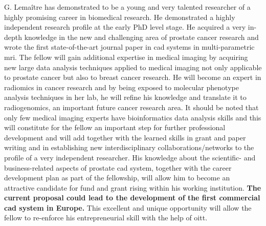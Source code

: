 G. Lema\^itre has demonstrated to be a young and very talented researcher of a highly promising career in biomedical research.
He demonstrated a highly independent research profile at the early PhD level stage. 
He acquired a very in-depth knowledge in the new and challenging area of prostate cancer research and wrote the first state-of-the-art journal paper in \ac{cad} systems in multi-parametric \ac{mri}.
The fellow will gain additional expertise in medical imaging by acquiring new large data analysis techniques applied to medical imaging not only applicable to prostate cancer but also to breast cancer research.
He will become an expert in radiomics in cancer research and by being exposed to molecular phenotype analysis techniques in her lab, he will refine his knowledge and translate it to radiogenomics, an important future cancer research area.
It should be noted that only few medical imaging experts have bioinformatics data analysis skills and this will constitute for the fellow an important step for further professional development and will add together with the learned skills in grant and paper writing and in establishing new interdisciplinary collaborations/networks to the profile of a very independent researcher.
His knowledge about the scientific- and business-related aspects of prostate \ac{cad} system, together with the career development plan as part of the fellowship, will allow him to become an attractive candidate for fund and grant rising within his working institution.
\textbf{The current proposal could lead to the development of the first commercial \ac{cad} system in Europe.}
This excellent and unique opportunity will allow the fellow to re-enforce his entrepreneurial skill with the help of \ac{oitt}. 